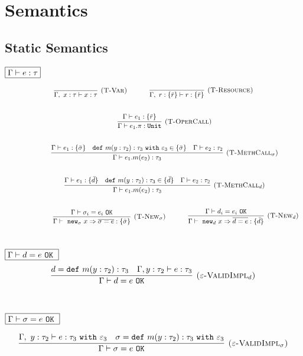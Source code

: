 \documentclass{llncs}
\newcommand{\keywadj}[1]{\mathtt{#1}}
\newcommand{\keyw}[1]{\keywadj{#1}~}
\begin{document}
\section{Semantics}

\subsection{Static Semantics}

\noindent
$\fbox{$\Gamma \vdash e : \tau$}$

\[
\begin{array}{c}
\infer[\textsc{(T-Var)}]
	{\Gamma,~x : \tau \vdash x : \tau}
	{}
~~~~~~~~~~
\infer[\textsc{(T-Resource)}]
	{\Gamma,~r : \{ \bar r \} \vdash r : \{ \bar r \}}
	{} \\[5ex]
~~~~~~~~~~
\infer[\textsc{(T-OperCall)}]
	{\Gamma \vdash e_1.\pi : \keywadj{Unit}}
	{\Gamma \vdash e_1 : \{ \bar r \}} \\[5ex]
~~~~~~~~~~
\infer[\textsc{(T-MethCall$_\sigma$)}]
	{\Gamma \vdash e_1.m(e_2) : \tau_3}
	{\Gamma \vdash e_1 : \{ \bar \sigma \} & \keyw{def} m(y : \tau_2) : \tau_3~\keyw{with} \varepsilon_3 \in \{ \bar \sigma \} &  \Gamma \vdash e_2 : \tau_2 }\\[5ex]
~~~~~~~~~~
\infer[\textsc{(T-MethCall$_d$)}]
	{\Gamma \vdash e_1.m(e_2) : \tau_3}
	{\Gamma \vdash e_1 : \{ \bar d\} & \keyw{def} m(y : \tau_2) : \tau_3 \in \{ \bar d \} &  \Gamma \vdash e_2 : \tau_2 }\\[5ex]
~~~~~~~~~~

~~~~~~~~~~
\infer[\textsc{(T-New$_\sigma$)}]
	{\Gamma \vdash~\keywadj{new}_\sigma~x \Rightarrow \overline{\sigma = e} : \{ \bar \sigma \}}
	{\Gamma \vdash \sigma_i = e_i~\keywadj{OK}}
~~~~~~~~~~
\infer[\textsc{(T-New$_d$)}]
	{\Gamma \vdash~\keywadj{new}_d~x \Rightarrow \overline{d = e} : \{ \bar d \}}
	{\Gamma \vdash d_i = e_i~\keywadj{OK}}\\[5ex]
\end{array}
\]

\noindent
$\fbox{$\Gamma \vdash d = e~\keyw{OK}$}$
\[
\begin{array}{c}
\infer[\textsc{($\varepsilon$-ValidImpl$_d$)}]
	{\Gamma \vdash d = e~\keywadj{OK}}
	{d = \keyw{def} m(y : \tau_2) : \tau_3 & \Gamma, y : \tau_2 \vdash e : \tau_3}
	\\[5ex]
\end{array}
\]

\noindent
$\fbox{$\Gamma \vdash \sigma = e~\keyw{OK}$}$

\[
\begin{array}{c}
\infer[\textsc{($\varepsilon$-ValidImpl$_\sigma$)}]
	{\Gamma \vdash \sigma = e~\keywadj{OK}}
	{\Gamma,~y:\tau_2 \vdash e: \tau_3~\keyw{with} \varepsilon_3 & \sigma = \keyw{def} m(y:\tau_2):\tau_3~\keyw{with} \varepsilon_3} \\[5ex]
\end{array}
\]
\end{document}
